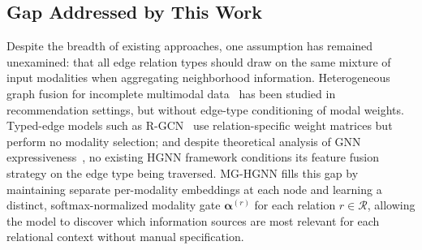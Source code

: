 \documentclass[sigconf]{acmart}
\begin{document}
\subsection{Gap Addressed by This Work}

Despite the breadth of existing approaches, one assumption has remained
unexamined: that all edge relation types should draw on the same mixture of
input modalities when aggregating neighborhood information.
Heterogeneous graph fusion for incomplete multimodal
data~\citep{chen2020hgmf} has been studied in
recommendation settings, but without edge-type
conditioning of modal weights.
Typed-edge models such as
R-GCN~\citep{schlichtkrull2018modeling} use
relation-specific weight matrices but perform no
modality selection; and despite theoretical analysis
of GNN expressiveness~\citep{xu2019powerful}, no
existing HGNN framework conditions its feature
fusion strategy on the edge type being traversed.
MG-HGNN fills this gap by maintaining separate per-modality
embeddings at each node and learning a distinct, softmax-normalized modality
gate $\boldsymbol{\alpha}^{(r)}$ for each relation $r \in \mathcal{R}$,
allowing the model to discover which information sources are most relevant
for each relational context without manual specification.

\end{document}
